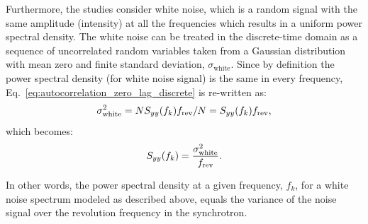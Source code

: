 Furthermore, the studies consider white noise, which is a random signal with the same amplitude (intensity) at all the frequencies which results in a uniform power spectral density. The white noise can be treated in the discrete-time domain as a sequence of uncorrelated random variables taken from a Gaussian distribution with mean zero and finite standard deviation, $\sigma_\mathrm{white}$.  Since by definition the power spectral density (for white noise signal) is the same in every frequency, Eq.~\eqref{eq:autocorrelation_zero_lag_discrete} is re-written as:
\begin{equation}\label{eq:psd_for_white_noise_variance_v0}
    \sigma_\mathrm{white}^2 =  N S_{yy}(f_k) {f_\mathrm{rev}}/N = S_{yy}(f_k) {f_\mathrm{rev}},
\end{equation}
which becomes:
\begin{equation}\label{eq:psd_for_white_noise_variance}
   S_{yy}(f_k) = \frac{\sigma_\mathrm{white}^2 } {{f_\mathrm{rev}}}.
\end{equation}


In other words, the power spectral density at a given frequency, $f_k$, for a white noise spectrum modeled as described above, equals the variance of the noise signal over the revolution frequency in the synchrotron.



